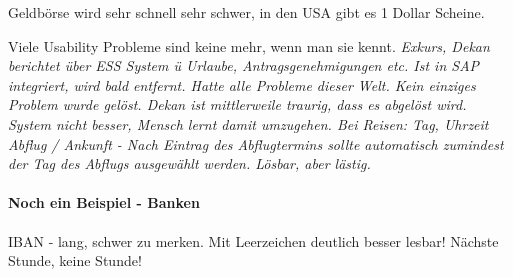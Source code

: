 Geldbörse wird sehr schnell sehr schwer, in den USA gibt es 1 Dollar Scheine.

Viele Usability Probleme sind keine mehr, wenn man sie kennt. \textit{Exkurs, Dekan 
berichtet über ESS System ü Urlaube, Antragsgenehmigungen etc. Ist in SAP integriert,
wird bald entfernt. Hatte alle Probleme dieser Welt. Kein einziges Problem wurde gelöst.
Dekan ist mittlerweile traurig, dass es abgelöst wird. System nicht besser, Mensch lernt
damit umzugehen. Bei Reisen: Tag, Uhrzeit Abflug / Ankunft - Nach Eintrag des Abflugtermins
sollte automatisch zumindest der Tag des Abflugs ausgewählt werden. Lösbar, aber lästig.}

\paragraph{Noch ein Beispiel - Banken}
IBAN - lang, schwer zu merken. Mit Leerzeichen deutlich besser lesbar!
Nächste Stunde, keine Stunde!


